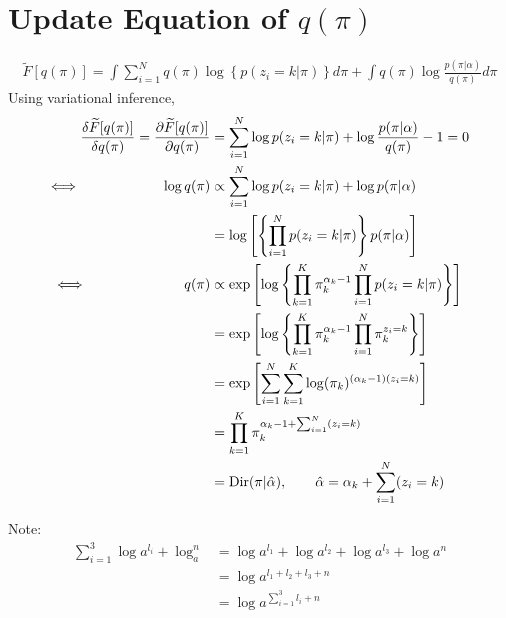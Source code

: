 \documentclass[a4paper,10.5pt,dvipdfmx]{jarticle}  %
\begin{document}
\section{Update Equation of $q(\pi)$}
\begin{align}
	\widetilde{F}[q(\pi)] = \int \sum_{i=1}^{N} q(\pi) \log \left\{ p(z_i=k | \pi) \right\} d\pi + \int q(\pi) \log \frac{p(\pi|\alpha)}{q(\pi)} d\pi
\end{align}
Using variational inference,
\begin{align}
	\frac{\delta \widetilde{F}[q(\pi)]}{\delta q(\pi)} = \frac{\partial \widetilde{F}[q(\pi)]}{\partial q(\pi)} &= \sum_{i=1}^{N} \log p(z_i = k | \pi) + \log \frac{p(\pi | \alpha)}{q(\pi)} - 1 = 0\\
	\Longleftrightarrow \qquad  \qquad  \qquad \log q(\pi) &\propto \sum_{i=1}^{N} \log p(z_i=k | \pi) + \log p(\pi | \alpha) \\
&= \log \left[ \left\{ \prod_{i=1}^{N} p(z_i=k | \pi)   \right\} p(\pi | \alpha) \right]\\
\Longleftrightarrow \qquad \quad \qquad  \qquad  q(\pi) &\propto \exp \left[ \log \left\{ \prod_{k=1}^{K} \pi_{k}^{\alpha_k -1} \prod_{i=1}^{N} p(z_i = k | \pi)  \right\} \right] \\
&= \exp \left[ \log \left\{ \prod_{k=1}^{K} \pi_{k}^{\alpha_k -1} \prod_{i=1}^{N} \pi_{k}^{z_i=k}  \right\} \right]\\
&= \exp \left[ \sum_{i=1}^{N} \sum_{k=1}^{K} \log (\pi_k)^{(\alpha_k -1)(z_i = k)}  \right]\\
&= \prod_{k=1}^{K} \pi_{k}^{\alpha_k - 1 + \sum_{i=1}^{N} (z_i=k)} \\
&= {\rm Dir} (\pi | \hat{\alpha}), \qquad \hat{\alpha} = \alpha_k + \sum_{i=1}^{N} (z_i=k)
\end{align}

Note:
\begin{align}
	\sum_{i=1}^3 \log a^{l_i} + \log_a^n &= \log a^{l_1} + \log a^{l_2} + \log a^{l_3} + \log a^n\\
&= \log a^{l_1 + l_2 + l_3 + n} \\
&= \log a^{\sum_{i=1}^3 l_i + n}
\end{align}
\end{document}
